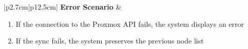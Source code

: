 \begin{table}[H]
\begin{tabular}{|p{2.7cm}|p{12.5cm}|}
        \hline
        \textbf{Error Scenario} & \begin{minipage}[t]{\linewidth}
                                      \begin{enumerate}[topsep=0pt,itemsep=1pt,parsep=0pt,partopsep=0pt]
                                          \item If the connection to the Proxmox API fails, the system displays an error
                                          \item If the sync fails, the system preserves the previous node list
                                      \end{enumerate}
                                  \end{minipage}                       \\
        \hline
    \end{tabular}
    \label{tab:admin-sync-nodes}
\end{table}
